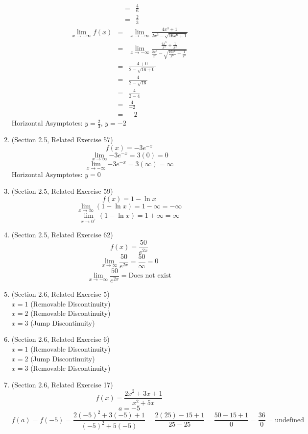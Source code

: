 \documentclass{article}
\begin{document}
\begin{enumerate}
\begin{eqnarray}
			&=& \frac{4}{6} \\
			&=& \frac{2}{3}
		\end{eqnarray}
		\begin{eqnarray}
			\lim_{x \to - \infty}{f(x)} &=& \lim_{x \to - \infty}{\frac{4x^3 + 1}{2x^3 - \sqrt{16x^6 + 1}}} \\
			&=& \lim_{x \to - \infty}{\frac{\frac{4x^3}{x^3} + \frac{1}{x^3}}{\frac{2x^3}{x^3} - \sqrt{\frac{16x^6}{x^6} + \frac{1}{x^6}}}} \\
			&=& \frac{4 + 0}{2 - \sqrt{16 + 0}} \\
			&=& \frac{4}{2 - \sqrt{16}} \\
			&=& \frac{4}{2 - 4} \\
			&=& \frac{4}{-2} \\
			&=& -2
		\end{eqnarray}
		Horizontal Asymptotes: $y = \frac{2}{3}$, $y = -2$
	\item (Section 2.5, Related Exercise 57)
        $$f(x) = -3e^{-x}$$
        $$\lim_{x \to \infty}{-3e^{-x}} = 3(0) = 0$$
        $$\lim_{x \to - \infty}{-3e^{-x}} = 3(\infty) = \infty$$
        Horizontal Asymptotes: $y = 0$
	\item (Section 2.5, Related Exercise 59)
        $$f(x) = 1 - \ln{x}$$
        $$\lim_{x \to \infty}{(1 - \ln{x})} = 1 - \infty = - \infty$$
        $$\lim_{x \to 0^+}{(1 - \ln{x})} = 1 + \infty = \infty$$
	\item (Section 2.5, Related Exercise 62)
        $$f(x) = \frac{50}{e^{2x}}$$
        $$\lim_{x \to \infty}{\frac{50}{e^{2x}}} = \frac{50}{\infty} = 0$$
        $$\lim_{x \to - \infty}{\frac{50}{e^{2x}}} = \text{Does not exist}$$
	\item (Section 2.6, Related Exercise 5)
		\\ $x = 1$ (Removable Discontinuity)
		\\ $x = 2$ (Removable Discontinuity)
		\\ $x = 3$ (Jump Discontinuity)
	\item (Section 2.6, Related Exercise 6)
		\\ $x = 1$ (Removable Discontinuity)
		\\ $x = 2$ (Jump Discontinuity)
		\\ $x = 3$ (Removable Discontinuity)
	\item (Section 2.6, Related Exercise 17)
		$$f(x) = \frac{2x^2 + 3x + 1}{x^2 + 5x}$$
		$$a = -5$$
		$$f(a) = f(-5) = \frac{2(-5)^2 + 3(-5) + 1}{(-5)^2 + 5(-5)} = \frac{2(25) - 15 + 1}{25 - 25} = \frac{50 - 15 + 1}{0} = \frac{36}{0} = \text{undefined}$$

\end{enumerate}
\end{document}
